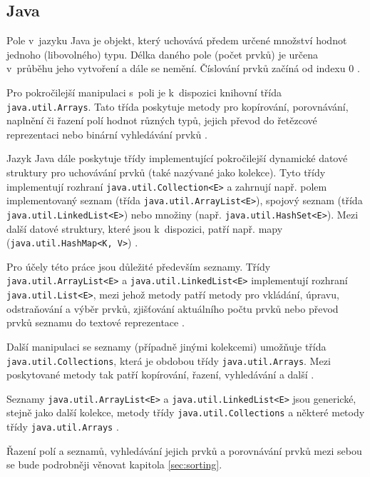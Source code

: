 \documentclass{bakalarka}
\begin{document}
\subsection{Java}
Pole v~jazyku Java je objekt, který uchovává předem určené množství hodnot jednoho (libovolného) typu. Délka daného pole (počet prvků) je určena v~průběhu jeho vytvoření a dále se nemění. Číslování prvků začíná od indexu 0 \cite{java-guide-array}.\par
Pro pokročilejší manipulaci s~poli je k~dispozici knihovní třída \texttt{java.util\-.Arrays}. Tato třída poskytuje metody pro kopírování, porovnávání, naplnění či řazení polí hodnot různých typů, jejich převod do řetězcové reprezentaci nebo binární vyhledávání prvků \cite{java-guide-arrays}.\par
Jazyk Java dále poskytuje třídy implementující pokročilejší dynamické datové struktury pro uchovávání prvků (také nazývané jako kolekce). Tyto třídy implementují rozhraní \texttt{java.util.Collection<E>} a zahrnují např. polem implementovaný seznam (třída \texttt{java.util.ArrayList<E>}), spojový seznam (třída \texttt{java.util.LinkedList<E>}) nebo množiny (např. \texttt{java.util\-.HashSet<E>}). Mezi další datové struktury, které jsou k~dispozici, patří např. mapy (\texttt{java.util.HashMap<K, V>}) \cite{java-guide-collection, java-guide-arraylist, java-guide-linkedlist, java-guide-hashset, java-guide-hashmap}.\par
Pro účely této práce jsou důležité především seznamy. Třídy \texttt{java.util\-.ArrayList<E>} a \texttt{java.util.LinkedList<E>} implementují rozhraní \texttt{java\-.util.List<E>}, mezi jehož metody patří metody pro vkládání, úpravu, odstraňování a výběr prvků, zjišťování aktuálního počtu prvků nebo převod prvků seznamu do textové reprezentace \cite{java-guide-list, java-guide-arraylist, java-guide-linkedlist}.\par
Další manipulaci se seznamy (případně jinými kolekcemi) umožňuje třída \texttt{java.util.Collections}, která je obdobou třídy \texttt{java.util.Arrays}. Mezi poskytované metody tak patří kopírování, řazení, vyhledávání a další \cite{java-guide-collections}.\par
Seznamy \texttt{java.util.ArrayList<E>} a \texttt{java.util.LinkedList<E>} jsou generické, stejně jako další kolekce, metody třídy \texttt{java.util.Collections} a některé metody třídy \texttt{java.util.Arrays} \cite{java-guide-arraylist, java-guide-linkedlist, java-guide-arrays, java-guide-collections}.\par
Řazení polí a seznamů, vyhledávání jejich prvků a porovnávání prvků mezi sebou se bude podrobněji věnovat kapitola \ref{sec:sorting}.
\end{document}
